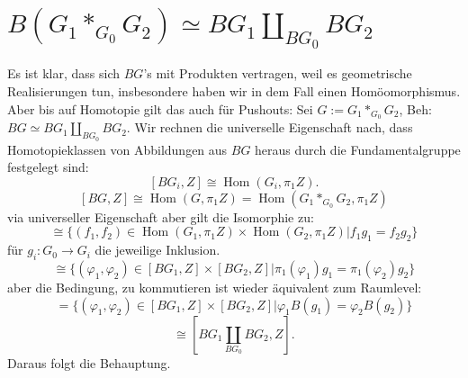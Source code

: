 \documentclass[11pt,twoside,a4paper]{scrbook} %
\DeclareMathOperator{\Hom}{Hom}
\begin{document}
\section{$B(G_1\ast_{G_0} G_2)\simeq BG_1\coprod_{BG_0}BG_2$}
Es ist klar, dass sich $BG$'s mit Produkten vertragen, weil es geometrische Realisierungen tun, insbesondere haben wir in dem Fall einen
Hom\"oomorphismus. Aber bis auf Homotopie gilt das auch f\"ur Pushouts: Sei $G:=G_1\ast_{G_0}G_2$, Beh: $BG \simeq BG_1\coprod_{BG_0}BG_2$. Wir rechnen
die universelle Eigenschaft nach, dass Homotopieklassen von Abbildungen aus $BG$ heraus durch die Fundamentalgruppe festgelegt sind: $$[BG_i,Z]\cong \Hom(G_i,\pi_1Z).$$
$$[BG,Z]\cong \Hom(G,\pi_1Z) = \Hom(G_1\ast_{G_0}G_2,\pi_1Z)$$
via universeller Eigenschaft aber gilt die Isomorphie zu:
$$\cong \{(f_1,f_2)\in \Hom(G_1,\pi_1Z)\times\Hom(G_2,\pi_1Z) | f_1g_1=f_2g_2\}$$
f\"ur $g_i\colon G_0 \rightarrow G_i$ die jeweilige Inklusion.
$$\cong \{(\varphi_1,\varphi_2)\in [BG_1,Z]\times[BG_2,Z]|\pi_1(\varphi_1)g_1=\pi_1(\varphi_2)g_2\}$$
aber die Bedingung, zu kommutieren ist wieder \"aquivalent zum Raumlevel:
$$= \{(\varphi_1,\varphi_2)\in [BG_1,Z]\times[BG_2,Z]|\varphi_1B(g_1)=\varphi_2B(g_2)\}$$
$$\cong [BG_1\coprod_{BG_0}BG_2,Z].$$
Daraus folgt die Behauptung.
\end{document}
